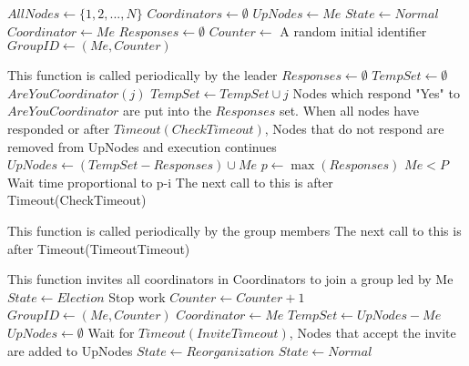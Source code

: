 \begin{algorithmic}

\State $AllNodes \gets \{ 1, 2, ..., N \}$
\State $Coordinators \gets \emptyset$
\State $UpNodes \gets { Me }$
\State $State \gets Normal$
\State $Coordinator \gets Me$
\State $Responses \gets \emptyset$
\State $Counter \gets$ A random initial identifier
\State $GroupID \gets (Me,Counter)$

\State

    \State This function is called periodically by the leader
        \State $Responses \gets \emptyset$
        \State $TempSet \gets \emptyset$
            \State $AreYouCoordinator(j)$
            \State $TempSet \gets TempSet \cup j$
        \EndFor
        \State Nodes which respond "Yes" to $AreYouCoordinator$ are put into 
the $Responses$ set. When all nodes have responded or after 
$Timeout(CheckTimeout)$, Nodes that do not respond are removed from UpNodes and 
execution continues
        \State $UpNodes \gets (TempSet-Responses) \cup {Me}$
            \Return
        \EndIf
        \State $p \gets \max(Responses)$
        \If $Me < P$
            \State Wait time proportional to p-i
        \EndIf
    \EndIf
    \State The next call to this is after Timeout(CheckTimeout)
\EndFunction

\State

    \State This function is called periodically by the group members
        \Return
    \Else
        \EndIf
    \EndIf
    \State The next call to this is after Timeout(TimeoutTimeout)
\EndFunction

\State

    \State This function invites all coordinators in Coordinators to join a 
group led by Me
    \State $State \gets Election$
    \State Stop work
    \State $Counter \gets Counter+1$
    \State $GroupID \gets (Me,Counter)$
    \State $Coordinator \gets Me$
    \State $TempSet \gets UpNodes - {Me}$
    \State $UpNodes \gets \emptyset$
    \EndFor
    \EndFor
    \State Wait for $Timeout(InviteTimeout)$, Nodes that accept the invite are 
added to UpNodes
    \State $State \gets Reorganization$
    \EndFor
    \State $State \gets Normal$
\EndFunction


\end{algorithmic}
